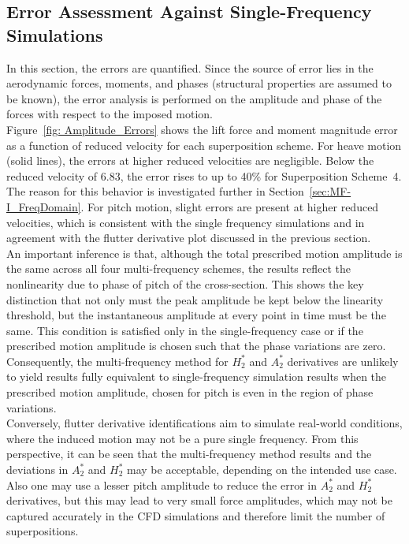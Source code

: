 \documentclass[../main]{subfiles}
\begin{document}
\subsection{Error Assessment Against Single-Frequency Simulations}

In this section, the errors are quantified.
Since the source of error lies in the aerodynamic forces, 
moments, and phases (structural properties are assumed to be known), the error analysis is performed 
on the amplitude and phase of the forces with respect to the imposed motion.\\

Figure~\ref{fig: Amplitude_Errors} shows the lift force and moment magnitude error as a function of reduced velocity for each superposition scheme.
For heave motion (solid lines), the errors at higher reduced velocities are negligible.
Below the reduced velocity of 6.83, the error rises to up to 40\% for Superposition Scheme~4.
The reason for this behavior is investigated further in Section~\ref{sec:MF-I_FreqDomain}.
For pitch motion, slight errors are present at higher reduced velocities, which is consistent with the single frequency simulations
 and in agreement with the flutter derivative plot discussed in the previous section.\\

An important inference is that, although the total prescribed motion amplitude is the same across all four 
multi-frequency schemes, the results reflect the nonlinearity due to phase of pitch of the cross-section.
This shows the key distinction that not only must the peak amplitude be kept 
below the linearity threshold, but the instantaneous amplitude at every point in time must 
be the same.
This condition is satisfied only in the single-frequency case or if the prescribed motion amplitude is chosen such that the phase variations are zero.
Consequently, the multi-frequency method for $H_2^*$ and $A_2^*$ derivatives are unlikely to yield results fully equivalent to single-frequency 
simulation results when the prescribed motion amplitude, chosen for pitch is even in the region of phase variations.\\

Conversely, flutter derivative identifications aim 
to simulate real-world conditions, where the induced motion may not be a pure single frequency.
From this perspective, it can be seen that the multi-frequency method results and the deviations 
in $A_2^*$ and $H_2^*$ may be acceptable, depending on the intended use case. 
Also one may use a lesser pitch amplitude to reduce the error in $A_2^*$ and $H_2^*$ derivatives, but this may lead to very small force amplitudes, 
which may not be captured accurately in the CFD simulations and therefore limit the number of superpositions.\\
\end{document}
